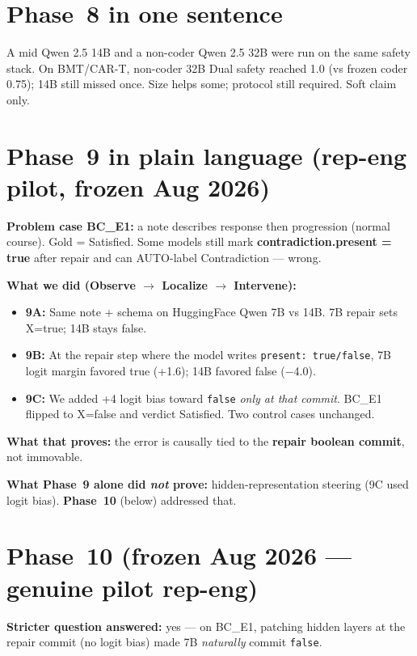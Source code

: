 \documentclass[11pt,a4paper]{article}
\begin{document}
\section{Phase~8 in one sentence}

A mid Qwen 2.5 14B and a non-coder Qwen 2.5 32B were run on the same safety stack.
On BMT/CAR-T, non-coder 32B Dual safety reached 1.0 (vs frozen coder 0.75); 14B still missed once. Size helps some; protocol still required. Soft claim only.

\section{Phase~9 in plain language (rep-eng pilot, frozen Aug 2026)}

\textbf{Problem case BC\_E1:} a note describes response then progression (normal course). Gold = Satisfied. Some models still mark \textbf{contradiction.present = true} after repair and can AUTO-label Contradiction --- wrong.

\textbf{What we did (Observe $\rightarrow$ Localize $\rightarrow$ Intervene):}
\begin{itemize}
  \item \textbf{9A:} Same note + schema on HuggingFace Qwen 7B vs 14B. 7B repair sets X=true; 14B stays false.
  \item \textbf{9B:} At the repair step where the model writes \texttt{present: true/false}, 7B logit margin favored true (+1.6); 14B favored false ($-$4.0).
  \item \textbf{9C:} We added +4 logit bias toward \texttt{false} \emph{only at that commit}. BC\_E1 flipped to X=false and verdict Satisfied. Two control cases unchanged.
\end{itemize}

\textbf{What that proves:} the error is causally tied to the \textbf{repair boolean commit}, not immovable.

\textbf{What Phase~9 alone did \emph{not} prove:} hidden-representation steering (9C used logit bias). \textbf{Phase~10} (below) addressed that.

\section{Phase~10 (frozen Aug 2026 --- genuine pilot rep-eng)}

\textbf{Stricter question answered:} yes --- on BC\_E1, patching hidden layers at the repair commit (no logit bias) made 7B \emph{naturally} commit \texttt{false}.
\end{document}

